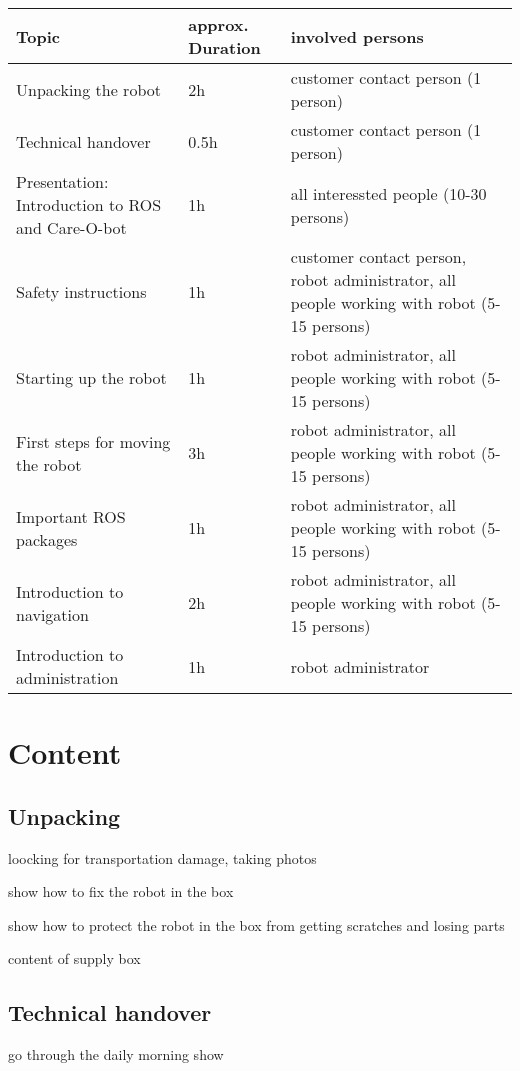 \documentclass[12pt,twoside]{report}
\begin{document}
\begin{table}[htb]
\begin{tabular}{|l|l|l|}
  \hline
  Topic & approx. Duration & involved persons \\ \hline \hline
  Unpacking the robot & 2h & customer contact person (1 person) \\ \hline
  Technical handover & 0.5h & customer contact person (1 person) \\ \hline
  Presentation: Introduction to ROS and Care-O-bot & 1h & all interessted people (10-30 persons) \\ \hline
  Safety instructions & 1h & customer contact person, robot administrator, all people working with robot (5-15 persons) \\ \hline
  Starting up the robot & 1h & robot administrator, all people working with robot (5-15 persons) \\ \hline
  First steps for moving the robot & 3h & robot administrator, all people working with robot (5-15 persons) \\ \hline
  Important ROS packages & 1h & robot administrator, all people working with robot (5-15 persons) \\ \hline
  Introduction to navigation & 2h & robot administrator, all people working with robot (5-15 persons) \\ \hline
  Introduction to administration & 1h & robot administrator \\ \hline 
  
  
\end{tabular}
\end{table}

\chapter{Content}

\section{Unpacking}
loocking for transportation damage, taking photos

show how to fix the robot in the box

show how to protect the robot in the box from getting scratches and losing parts

content of supply box

\section{Technical handover}
go through the daily morning show
\end{document}
